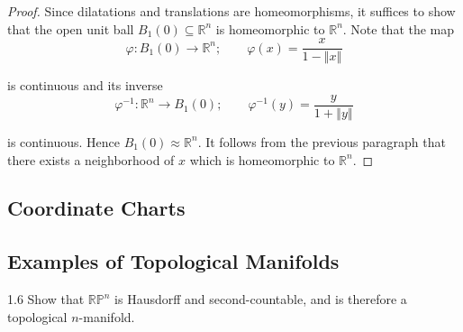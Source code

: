 \begin{proof}
    Since dilatations and translations are homeomorphisms, it suffices to show that the open unit ball \( B_{1}(0) \subseteq \mathbb{R}^{n} \) is homeomorphic to \( \mathbb{R}^{n} \). Note that the map
    \[
        \varphi: B_{1}(0) \to \mathbb{R}^{n}; \qquad \varphi(x) = \dfrac{x}{1 - \left\Vert x \right\Vert}
    \]

    is continuous and its inverse
    \[
        \varphi^{-1}: \mathbb{R}^{n} \to B_{1}(0); \qquad \varphi^{-1}(y) = \dfrac{y}{1 + \left\Vert y \right\Vert}
    \]

    is continuous. Hence \( B_{1}(0) \approx \mathbb{R}^{n} \). It follows from the previous paragraph that there exists a neighborhood of \( x \) which is homeomorphic to \( \mathbb{R}^{n} \).
\end{proof}

\subsection{Coordinate Charts}

\subsection{Examples of Topological Manifolds}

\begin{exercise}{1.6}
    Show that \( \mathbb{RP}^{n} \) is Hausdorff and second-countable, and is therefore a topological \( n \)-manifold.
\end{exercise}

